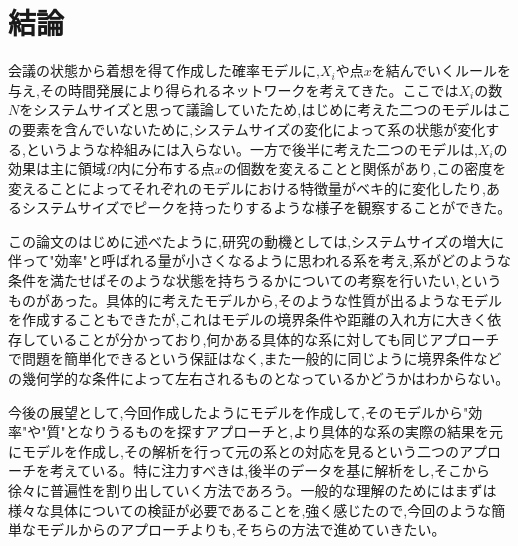\chapter{結論}

会議の状態から着想を得て作成した確率モデルに,$X_{i}$や点$x$を結んでいくルールを与え,その時間発展により得られるネットワークを考えてきた。ここでは$X_{i}$の数$N$をシステムサイズと思って議論していたため,はじめに考えた二つのモデルはこの要素を含んでいないために,システムサイズの変化によって系の状態が変化する,というような枠組みには入らない。一方で後半に考えた二つのモデルは,$X_{i}$の効果は主に領域$\Omega$内に分布する点$x$の個数を変えることと関係があり,この密度を変えることによってそれぞれのモデルにおける特徴量がベキ的に変化したり,あるシステムサイズでピークを持ったりするような様子を観察することができた。

この論文のはじめに述べたように,研究の動機としては,システムサイズの増大に伴って"効率"と呼ばれる量が小さくなるように思われる系を考え,系がどのような条件を満たせばそのような状態を持ちうるかについての考察を行いたい,というものがあった。具体的に考えたモデルから,そのような性質が出るようなモデルを作成することもできたが,これはモデルの境界条件や距離の入れ方に大きく依存していることが分かっており,何かある具体的な系に対しても同じアプローチで問題を簡単化できるという保証はなく,また一般的に同じように境界条件などの幾何学的な条件によって左右されるものとなっているかどうかはわからない。

今後の展望として,今回作成したようにモデルを作成して,そのモデルから"効率"や"質"となりうるものを探すアプローチと,より具体的な系の実際の結果を元にモデルを作成し,その解析を行って元の系との対応を見るという二つのアプローチを考えている。特に注力すべきは,後半のデータを基に解析をし,そこから徐々に普遍性を割り出していく方法であろう。一般的な理解のためにはまずは様々な具体についての検証が必要であることを,強く感じたので,今回のような簡単なモデルからのアプローチよりも,そちらの方法で進めていきたい。

